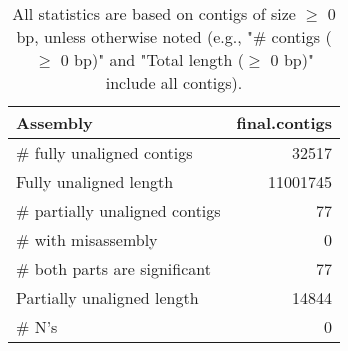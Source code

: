 \documentclass[12pt,a4paper]{article}
\begin{document}
\begin{table}[ht]
\begin{center}
\caption{All statistics are based on contigs of size $\geq$ 0 bp, unless otherwise noted (e.g., "\# contigs ($\geq$ 0 bp)" and "Total length ($\geq$ 0 bp)" include all contigs).}
\begin{tabular}{|l*{1}{|r}|}
\hline
Assembly & final.contigs \\ \hline
\# fully unaligned contigs & 32517 \\ \hline
Fully unaligned length & 11001745 \\ \hline
\# partially unaligned contigs & 77 \\ \hline
\hspace{5mm}\# with misassembly & 0 \\ \hline
\hspace{5mm}\# both parts are significant & 77 \\ \hline
Partially unaligned length & 14844 \\ \hline
\# N's & 0 \\ \hline
\end{tabular}
\end{center}
\end{table}
\end{document}
